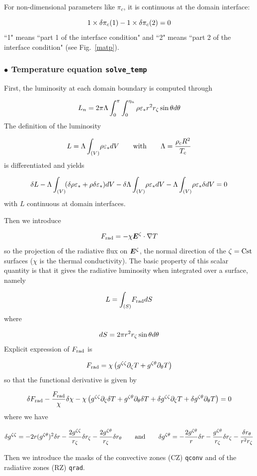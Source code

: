 For non-dimensional parameters like $\pi_c$, it is continuous at the domain
interface:

\[ 1\times\delta\pi_c({\rm 1}) -1\times\delta\pi_c({\rm 2}) = 0\]
``1" means ``part 1 of the interface condition" and ``2" means ``part 2
of the interface condition" (see Fig.~\ref{matp}).


\subsubsection{$\bullet$ \bf Temperature equation {\tt solve\_temp}}

First, the luminosity at each domain boundary is computed through

\[ L_n = 2\pi\Lambda\int_0^\pi\int_0^{\eta_n} \rho\varepsilon_* r^2r_\zeta\sin\theta
d\theta\]
The definition of the luminosity 

\[ L=\Lambda\int_{(V)}\! \rho\varepsilon_* dV {\qquad {\rm with}\qquad} \Lambda = \frac{\rho_cR^2}{T_c}\]
is differentiated and yields

\[ \delta L - \Lambda\int_{(V)}\! (\delta\rho\varepsilon_* +\rho\delta\varepsilon_*)dV -
\delta\Lambda\int_{(V)}\! \rho\varepsilon_* dV - \Lambda\int_{(V)}\! \rho\varepsilon_* \delta dV
= 0\]
with $L$ continuous at domain interfaces.

Then we introduce

\[ \frad = -\chi\vE^\zeta\cdot\na T\]
so the projection of the radiative flux on $\vE^\zeta$, the normal
direction of the $\zeta={\rm Cst}$ surfaces ($\chi$ is the thermal
conductivity). The basic property of this
scalar quantity is that it gives the radiative luminosity when
integrated over a surface, namely

\[ L= \int_{(S)}\! F_{\rm rad} dS\]
where

\[ dS = 2\pi r^2r_\zeta\sin\theta d\theta\]
Explicit expression of $F_{\rm rad}$ is

\[ F_{\rm rad} = \chi\left(g^{\zeta\zeta}\partial_\zeta T + g^{\zeta\theta}\partial_\theta T \right)\]
so that the functional derivative is given by

\[ \delta F_{\rm rad} -\frac{F_{\rm rad}}{\chi}\delta\chi -\chi\left(
g^{\zeta\zeta}\partial_\zeta\delta T + g^{\zeta\theta}\partial_\theta\delta T +
\delta g^{\zeta\zeta}\partial_\zeta T + \delta g^{\zeta\theta}\partial_\theta T\right) = 0\]
where we have

\[ \delta g^{\zeta\zeta} = -2r(g^{\zeta\theta})^2\delta r -\frac{2g^{\zeta\zeta}}{r_\zeta}\delta r_\zeta
-\frac{2g^{\zeta\theta}}{r_\zeta}\delta r_\theta\qquad {\rm and}\qquad
\delta g^{\zeta\theta} = -\frac{2g^{\zeta\theta}}{r}\delta r -\frac{g^{\zeta\theta}}{r_\zeta}\delta r_\zeta
-\frac{\delta r_\theta}{r^2r_\zeta}\]

Then we introduce the masks of the convective zones (CZ) {\tt qconv} and
of the radiative zones (RZ) {\tt qrad}.


